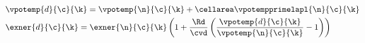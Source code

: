 $$\begin{aligned}
    & \vpotemp{d}{\c}{\k} = \vpotemp{\n}{\c}{\k} + \cellarea \vpotempprimelapl{\n}{\c}{\k} \\
    & \exner{d}{\c}{\k} = \exner{\n}{\c}{\k} \left( 1 + \frac{\Rd}{\cvd} \left( \frac{\vpotemp{d}{\c}{\k}}{\vpotemp{\n}{\c}{\k}} -1 \right) \right)
\end{aligned}$$